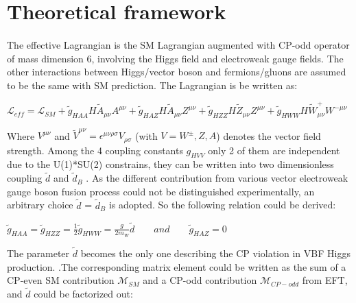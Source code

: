 \section{Theoretical framework}
\label{sec:theory}
\paragraph{} The effective Lagrangian is the SM Lagrangian augmented with CP-odd operator of mass dimension 6, involving the Higgs field and electroweak gauge fields. The other interactions between Higgs/vector boson and fermions/gluons are assumed to be the same with SM prediction. The Lagrangian is be written as: 

\begin{center}
\begin{math}
\mathcal{L}_{eff} = \mathcal{L}_{SM}+ \tilde{g}_{HAA}H\tilde{A}_{\mu\nu}A^{\mu\nu} + \tilde{g}_{HAZ}H\tilde{A}_{\mu\nu}Z^{\mu\nu} + \tilde{g}_{HZZ}H\tilde{Z}_{\mu\nu}Z^{\mu\nu} + \tilde{g}_{HWW}H\tilde{W}_{\mu\nu}^{+}W^{-\mu\nu}
\end{math}
\end{center}
Where $V^{\mu\nu}$ and $\tilde{V}^{\mu\nu}=\epsilon^{\mu\nu\rho\sigma}V_{\rho\sigma} $ (with $V=W^{\pm},Z,A$) denotes the vector field strength. Among the 4 coupling constants $g_{HVV}$ only 2 of them are independent due to the U(1)*SU(2)  constrains, they can be written into two dimensionless coupling $\tilde{d}$ and $\tilde{d}_B$ . As the different contribution from various vector electroweak gauge boson fusion process could not be distinguished experimentally, an arbitrary choice $\tilde{d}$ = $\tilde{d}_B$ is adopted. So the following relation could be derived: 

\begin{center}
\begin{math}
\tilde{g}_{HAA} = \tilde{g}_{HZZ} = \frac{1}{2} \tilde{g}_{HWW} = \frac{g}{2m_{W}}\tilde{d} \qquad and \qquad \tilde{g}_{HAZ}=0
\end{math}
\end{center}

The parameter $\tilde{d}$ becomes the only one describing the CP violation in VBF Higgs production. .The corresponding matrix element could be written as the sum of a CP-even SM contribution $\mathcal{M}_{SM}$ and a CP-odd contribution $\mathcal{M}_{CP-odd}$ from EFT, and $\tilde{d}$ could be factorized out:

